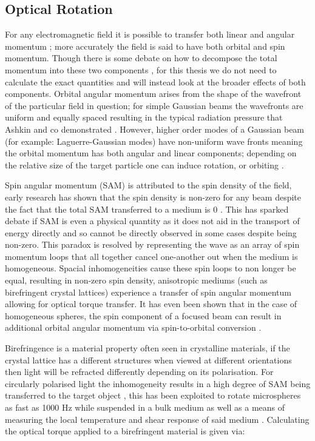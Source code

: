 \subsection{Optical Rotation}
For any electromagnetic field it is possible to transfer both linear and 
angular momentum \cite{Beth1936MechanicalDA}; more accurately the field 
is said to have both orbital and spin momentum. Though there is some 
debate on how to decompose the total momentum into these two components 
\cite{Bruce2020, Svak2018}, for this thesis we do not need to calculate 
the exact quantities and will instead look at the broader effects of both 
components. Orbital angular momentum arises from the shape of the wavefront 
of the particular field in question; for simple Gaussian beams the wavefronts 
are uniform and equally spaced resulting in the typical radiation pressure 
that Ashkin and co demonstrated \cite{Ashkin1980}. However, higher order 
modes of a Gaussian beam (for example: Laguerre-Gaussian modes) have 
non-uniform wave fronts meaning the orbital momentum has both angular and
linear components; depending on the relative size of the target particle 
one can induce rotation, or orbiting \cite{Bruce2020, Courtial2000}. 

Spin angular momentum (SAM) is attributed to the spin density of the field, 
early research has shown that the spin density is non-zero for any beam despite
the fact that the total SAM transferred to a medium is 0 \cite{Svak2018, 
Bliokh2014}. This has sparked debate if SAM is even a physical quantity as 
it does not aid in the transport of energy directly \cite{Bliokh2014} and 
so cannot be directly observed in some cases despite being non-zero. This 
paradox is resolved by representing the wave as an array of spin momentum 
loops that all together cancel one-another out when the medium is homogeneous.
Spacial inhomogeneities cause these spin loops to non longer be equal, resulting
in non-zero spin density, anisotropic mediums (such as birefringent crystal 
lattices) experience a transfer of spin angular momentum allowing for optical
torque transfer. It has even been shown that in the case of homogeneous spheres, 
the spin component of a focused beam can result in additional orbital angular
momentum via spin-to-orbital conversion \cite{Yevick2017}. 

Birefringence is a material property often seen in crystalline materials, 
if the crystal lattice has a different structures when viewed at different 
orientations then light will be refracted differently depending on its 
polarisation. For circularly polarised light the inhomogeneity results in 
a high degree of SAM being transferred to the target object \cite{Parkin2009,
Arita2016}, this has been exploited to rotate microspheres as fast as 1000 Hz 
while suspended in a bulk medium \cite{Arita2016} as well as a means of 
measuring the local temperature and shear response of said medium 
\cite{Millen2014, RodriguezSevilla2018}. Calculating the optical torque 
applied to a birefringent material is given via:

